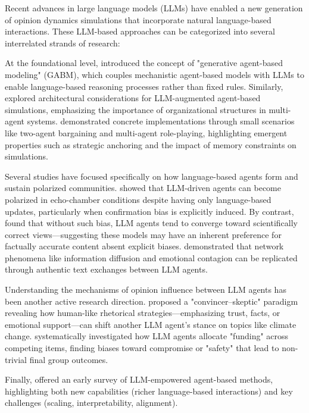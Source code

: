 Recent advances in large language models (LLMs) have enabled a new generation of opinion dynamics simulations that incorporate natural language-based interactions. These LLM-based approaches can be categorized into several interrelated strands of research:

At the foundational level, \citep{ghaffarzadegan_generative_2024} introduced the concept of "generative agent-based modeling" (GABM), which couples mechanistic agent-based models with LLMs to enable language-based reasoning processes rather than fixed rules. Similarly, \citep{gurcan_llm_2024} explored architectural considerations for LLM-augmented agent-based simulations, emphasizing the importance of organizational structures in multi-agent systems. \citep{junprung_exploring_2024} demonstrated concrete implementations through small scenarios like two-agent bargaining and multi-agent role-playing, highlighting emergent properties such as strategic anchoring and the impact of memory constraints on simulations.

Several studies have focused specifically on how language-based agents form and sustain polarized communities. \citep{ohagi_polarization_2024} showed that LLM-driven agents can become polarized in echo-chamber conditions despite having only language-based updates, particularly when confirmation bias is explicitly induced. By contrast, \citep{chuang_simulating_2024} found that without such bias, LLM agents tend to converge toward scientifically correct views—suggesting these models may have an inherent preference for factually accurate content absent explicit biases. \citep{gao_social_2024} demonstrated that network phenomena like information diffusion and emotional contagion can be replicated through authentic text exchanges between LLM agents.

Understanding the mechanisms of opinion influence between LLM agents has been another active research direction. \citep{breum_persuasive_2024} proposed a "convincer–skeptic" paradigm revealing how human-like rhetorical strategies—emphasizing trust, facts, or emotional support—can shift another LLM agent's stance on topics like climate change. \citep{velarde_principles_2024} systematically investigated how LLM agents allocate "funding" across competing items, finding biases toward compromise or "safety" that lead to non-trivial final group outcomes.

Finally, \citep{gao_large_2024} offered an early survey of LLM-empowered agent-based methods, highlighting both new capabilities (richer language-based interactions) and key challenges (scaling, interpretability, alignment).

